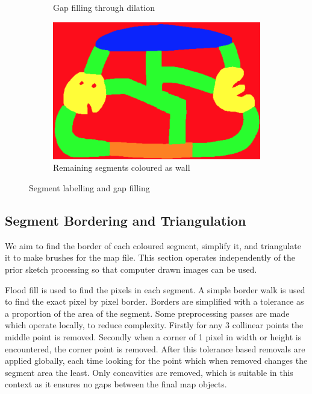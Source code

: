 \documentclass{IEEEtran}
\begin{document}
\begin{figure}[h]
\begin{subfigure}[b]{0.24\textwidth}
         \caption{Gap filling through dilation}
         \label{fig:l3}
     \end{subfigure}
     \hfill
     \begin{subfigure}[b]{0.24\textwidth}
         \centering
         \includegraphics[width=\textwidth]{l4}
         \caption{Remaining segments coloured as wall}
         \label{fig:l4}
     \end{subfigure}
        \caption{Segment labelling and gap filling}
        \label{fig:labelling}
\end{figure}

\subsection{Segment Bordering and Triangulation}

We aim to find the border of each coloured segment, simplify it, and triangulate it to make brushes for the map file. This section operates independently of the prior sketch processing so that computer drawn images can be used.

Flood fill is used to find the pixels in each segment. A simple border walk is used to find the exact pixel by pixel border. Borders are simplified with a tolerance as a proportion of the area of the segment. Some preprocessing passes are made which operate locally, to reduce complexity. Firstly for any 3 collinear points the middle point is removed. Secondly when a corner of 1 pixel in width or height is encountered, the corner point is removed. After this tolerance based removals are applied globally, each time looking for the point which when removed changes the segment area the least. Only concavities are removed, which is suitable in this context as it ensures no gaps between the final map objects.
\end{document}
